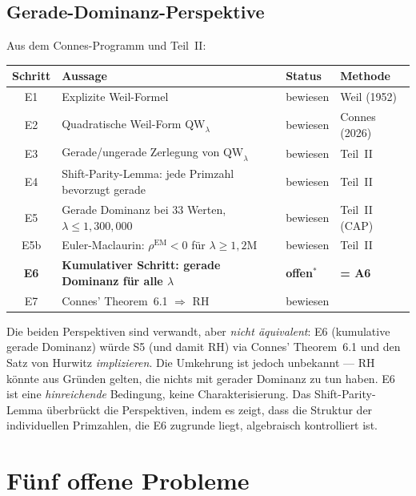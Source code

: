 \documentclass[12pt,a4paper]{article}
\theoremstyle{definition}
\theoremstyle{remark}
\begin{document}
\subsection{Gerade-Dominanz-Perspektive}

Aus dem Connes-Programm und Teil~II:

\begin{center}
\renewcommand{\arraystretch}{1.2}
\begin{tabular}{c|l|l|l}
\textbf{Schritt} & \textbf{Aussage} & \textbf{Status} & \textbf{Methode} \\\hline
E1 & Explizite Weil-Formel & bewiesen & Weil (1952) \\
E2 & Quadratische Weil-Form $\mathrm{QW}_\lambda$ & bewiesen & Connes (2026) \\
E3 & Gerade/ungerade Zerlegung von $\mathrm{QW}_\lambda$ & bewiesen & Teil~II \\
E4 & Shift-Parity-Lemma: jede Primzahl bevorzugt gerade & bewiesen & Teil~II \\
E5 & Gerade Dominanz bei $33$ Werten, $\lambda \leq 1{,}300{,}000$ & bewiesen & Teil~II (CAP) \\
E5b & Euler-Maclaurin: $\rho^{\mathrm{EM}} < 0$ für $\lambda \geq 1{,}2\mathrm{M}$ & bewiesen & Teil~II \\
\textbf{E6} & \textbf{Kumulativer Schritt: gerade Dominanz für alle $\lambda$} & \textbf{offen${}^*$} & \textbf{= A6} \\
E7 & Connes' Theorem~6.1 $\Rightarrow$ RH & bewiesen & \cite{Connes2026}
\end{tabular}
\end{center}

\noindent Die beiden Perspektiven sind verwandt, aber \emph{nicht äquivalent}: E6 (kumulative gerade Dominanz) würde S5 (und damit RH) via Connes' Theorem~6.1 und den Satz von Hurwitz \emph{implizieren}. Die Umkehrung ist jedoch unbekannt --- RH könnte aus Gründen gelten, die nichts mit gerader Dominanz zu tun haben. E6 ist eine \emph{hinreichende} Bedingung, keine Charakterisierung. Das Shift-Parity-Lemma überbrückt die Perspektiven, indem es zeigt, dass die Struktur der individuellen Primzahlen, die E6 zugrunde liegt, algebraisch kontrolliert ist.


\section{Fünf offene Probleme}
\label{sec:open-problems}
\end{document}
